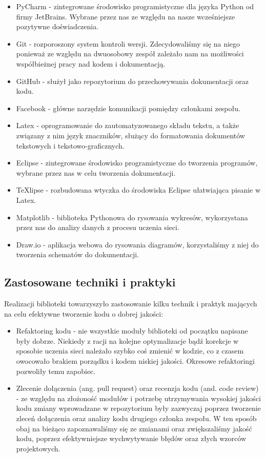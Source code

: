 \begin{itemize}
  \item PyCharm - zintegrowane środowisko programistyczne dla języka Python od firmy JetBrains.
  Wybrane przez nas ze względu na nasze wcześniejsze pozytywne doświadczenia.
  \item Git - rozporoszony system kontroli wersji. Zdecydowaliśmy się na niego ponieważ ze względu na
  dwuosobowy zespół zależało nam na możliwości współbieżnej pracy nad kodem i dokumentacją.
  \item GitHub - służył jako repozytorium do przechowywania dokumentacji oraz kodu.
  \item Facebook - główne narzędzie komunikacji pomiędzy członkami zespołu.
  \item Latex - oprogramowanie do zautomatyzowanego składu tekstu, a także związany z nim język
  znaczników, służący do formatowania dokumentów tekstowych i tekstowo-graficznych.
  \item Eclipse - zintegrowane środowisko programistyczne do tworzenia programów, wybrane przez nas
  w celu tworzenia dokumentacji.
  \item TeXlipse - rozbudowana wtyczka do środowiska Eclipse ułatwiająca pisanie w Latex.
  \item Matplotlib - biblioteka Pythonowa do rysowania wykresów, wykorzystana przez nas do analizy danych
  z procesu uczenia sieci.
  \item Draw.io - aplikacja webowa do rysowania diagramów, korzystaliśmy z niej do tworzenia
  schematów do dokumentacji.
\end{itemize}

\subsection{Zastosowane techniki i praktyki}
Realizacji biblioteki towarzyszyło zastosowanie kilku technik i praktyk mających na celu efektywne
tworzenie kodu o dobrej jakości:
\begin{itemize}
  \item Refaktoring kodu - nie wszystkie moduły biblioteki od początku napisane były dobrze. Niekiedy z racji
  na kolejne optymalizacje bądź korekcje w sposobie uczenia sieci należało szybko coś zmienić w kodzie,
  co z czasem owocowało brakiem porządku i kodem niskiej jakości. Okresowe refaktoringi pozwoliły temu zapobiec.
  \item Zlecenie dołączenia (ang. pull request) oraz recenzja kodu (and. code review) - ze względu na złożoność modułów i potrzebę utrzymywania wysokiej
  jakości kodu zmiany wprowadzane w repozytorium były zazwyczaj poprzez tworzenie zleceń dołączenia oraz analizy kodu
  drugiego członka zespołu. W ten sposób obaj na bieżąco zapoznawaliśmy się ze zmianami oraz zwiększaliśmy
  jakość kodu, poprzez efektywniejsze wychwytywanie błędów oraz złych wzorców projektowych.
\end{itemize}

